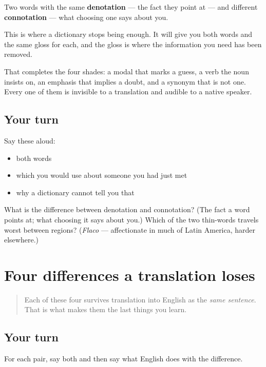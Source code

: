 \begin{grammarlens}[title={What you've built}]
Two words with the same \textbf{denotation} — the fact they point at — and different \textbf{connotation} — what choosing one says about you.

This is where a dictionary stops being enough. It will give you both words and the same gloss for each, and the gloss is where the information you need has been removed.

That completes the four shades: a modal that marks a guess, a verb the noun insists on, an emphasis that implies a doubt, and a synonym that is not one. Every one of them is invisible to a translation and audible to a native speaker.
\end{grammarlens}

\subsection*{Your turn}
Say these aloud:

\begin{itemize}
\raggedright
  \item both words
  \item which you would use about someone you had just met
  \item why a dictionary cannot tell you that
\end{itemize}

\begin{tcolorbox}[breakable,colback=teal!4,colframe=teal!35!black,title={Before you move on}]
What is the difference between denotation and connotation? (The fact a word points at; what choosing it says about you.) Which of the two thin-words travels worst between regions? (\emph{Flaco} — affectionate in much of Latin America, harder elsewhere.)
\end{tcolorbox}
\section[Practice]{Four differences a translation loses}

\label{lesson:ES-C275-practice}



\begin{quote}
Each of these four survives translation into English as the \emph{same sentence}. That is what makes them the last things you learn.
\end{quote}

\subsection*{Your turn}
For each pair, say both and then say what English does with the difference.

